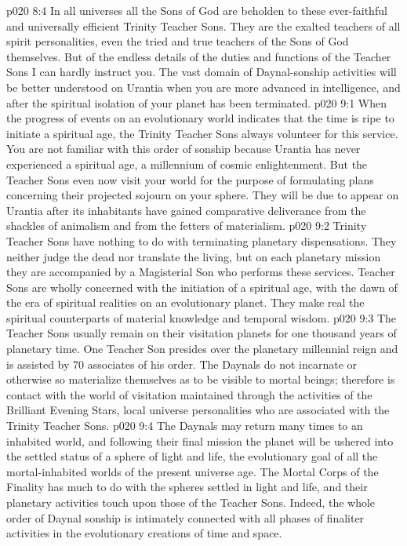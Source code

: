 \vs p020 8:4 In all universes all the Sons of God are beholden to these ever\hyp{}faithful and universally efficient Trinity Teacher Sons. They are the exalted teachers of all spirit personalities, even the tried and true teachers of the Sons of God themselves. But of the endless details of the duties and functions of the Teacher Sons I can hardly instruct you. The vast domain of Daynal\hyp{}sonship activities will be better understood on Urantia when you are more advanced in intelligence, and after the spiritual isolation of your planet has been terminated.
\vs p020 9:1 When the progress of events on an evolutionary world indicates that the time is ripe to initiate a spiritual age, the Trinity Teacher Sons always volunteer for this service. You are not familiar with this order of sonship because Urantia has never experienced a spiritual age, a millennium of cosmic enlightenment. But the Teacher Sons even now visit your world for the purpose of formulating plans concerning their projected sojourn on your sphere. They will be due to appear on Urantia after its inhabitants have gained comparative deliverance from the shackles of animalism and from the fetters of materialism.
\vs p020 9:2 Trinity Teacher Sons have nothing to do with terminating planetary dispensations. They neither judge the dead nor translate the living, but on each planetary mission they are accompanied by a Magisterial Son who performs these services. Teacher Sons are wholly concerned with the initiation of a spiritual age, with the dawn of the era of spiritual realities on an evolutionary planet. They make real the spiritual counterparts of material knowledge and temporal wisdom.
\vs p020 9:3 The Teacher Sons usually remain on their visitation planets for one thousand years of planetary time. One Teacher Son presides over the planetary millennial reign and is assisted by 70 associates of his order. The Daynals do not incarnate or otherwise so materialize themselves as to be visible to mortal beings; therefore is contact with the world of visitation maintained through the activities of the Brilliant Evening Stars, local universe personalities who are associated with the Trinity Teacher Sons.
\vs p020 9:4 The Daynals may return many times to an inhabited world, and following their final mission the planet will be ushered into the settled status of a sphere of light and life, the evolutionary goal of all the mortal\hyp{}inhabited worlds of the present universe age. The Mortal Corps of the Finality has much to do with the spheres settled in light and life, and their planetary activities touch upon those of the Teacher Sons. Indeed, the whole order of Daynal sonship is intimately connected with all phases of finaliter activities in the evolutionary creations of time and space.
